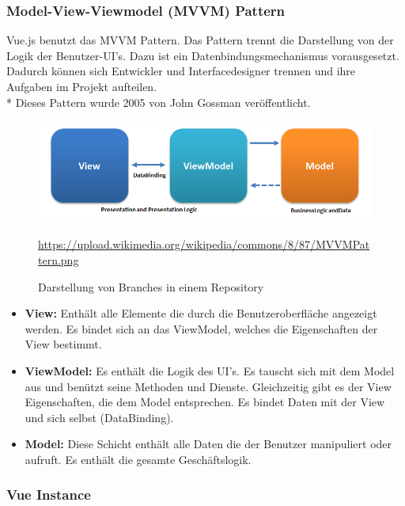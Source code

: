 \subsubsection{Model-View-Viewmodel (MVVM) Pattern }
Vue.js benutzt das MVVM Pattern. Das Pattern trennt die Darstellung von der Logik der Benutzer-UI's.
Dazu ist ein Datenbindungsmechanismus vorausgesetzt. Dadurch können sich Entwickler und Interfacedesigner trennen und ihre Aufgaben im Projekt 
aufteilen. \\*
Dieses Pattern wurde 2005 von John Gossman veröffentlicht. \cite{MVVM}

\begin{figure}[htp]
    \centering
    \includegraphics[scale=0.7]{pics/MVVMPattern.png}
    \caption{Darstellung von Branches in einem Repository}
        \small \url{https://upload.wikimedia.org/wikipedia/commons/8/87/MVVMPattern.png}
    \label{fig:impl:MVVM}
\end{figure}

\begin{itemize}
    \item \textbf{View:} Enthält alle Elemente die durch die Benutzeroberfläche angezeigt werden. Es bindet sich an das ViewModel, welches die Eigenschaften der View bestimmt.
    \item \textbf{ViewModel:} Es enthält die Logik des UI's. Es tauscht sich mit dem Model aus und benützt seine Methoden und Dienste. Gleichzeitig
          gibt es der View Eigenschaften, die dem Model entsprechen. Es bindet Daten mit der View und sich selbst (DataBinding).
    \item \textbf{Model:} Diese Schicht enthält alle Daten die der Benutzer manipuliert oder aufruft. Es enthält die gesamte Geschäftslogik.\cite{MVVM}
\end{itemize}

\clearpage

\subsubsection{Vue Instance}

